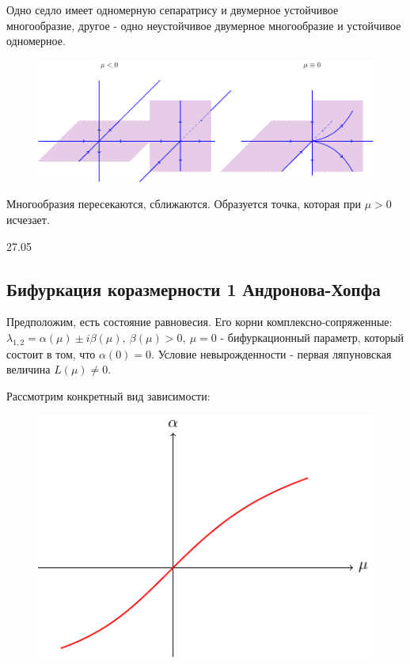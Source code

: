 Одно седло имеет одномерную сепаратрису и двумерное устойчивое многообразие, другое - одно неустойчивое двумерное многообразие и устойчивое одномерное.

\begin{figure}[H]
	\centering
	\includegraphics[width=1\linewidth]{fig/fig52.pdf}   
\end{figure}

Многообразия пересекаются, сближаются. Образуется точка, которая при $\mu>0$ исчезает.

27.05
\subsection{Бифуркация коразмерности 1 Андронова-Хопфа}
Предположим, есть состояние равновесия. Его корни комплексно-сопряженные: $\lambda_{1,2}=\alpha(\mu)\pm i \beta(\mu),~\beta(\mu)>0,~\mu=0$ - бифуркационный параметр, который состоит в том, что $\alpha(0)=0$. Условие невырожденности - первая ляпуновская величина $L(\mu)\neq 0$.

Рассмотрим конкретный вид зависимости:
\begin{figure} 
	\vspace{0.1em}
	\centering
	\includegraphics[scale=1]{fig/fig53.pdf}
	\vspace{-0.25em}
\end{figure}


